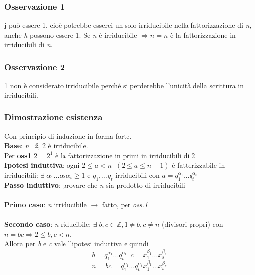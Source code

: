 \subsubsection{Osservazione 1}
j può essere 1, cioè potrebbe esserci un solo irriducibile nella fattorizzazione di \textit{n}, anche \textit{h} possono essere 1.
Se \textit{n} è irriducibile \(\Rightarrow n=n\) è la fattorizzazione in irriducibili di \textit{n}.

\subsubsection{Osservazione 2}
1 non è considerato irriducibile perché si perderebbe l'unicità della scrittura in irriducibili.

\subsubsection{Dimostrazione esistenza}
Con principio di induzione in forma forte.
\\
\textbf{Base}: \textit{n=2}, 2 è irriducibile.
\\
Per \textbf{oss1} \(2=2^1\) è la fattorizzazione in primi in irriducibili di 2
\\
\textbf{Ipotesi induttiva}: ogni \(2\leq a<n\;\;(2\leq a\leq n-1)\) è fattorizzabile in irriducibili: \(\exists\; \alpha _1...\alpha _t \alpha _i\geq 1\) e \(q_1,...q_t\) irriducibili con \(a=q^{\alpha _1}_1...q_t^{\alpha _t}\)
\\
\textbf{Passo induttivo}: provare che \textit{n} sia prodotto di irriducibili
\\\\
\textbf{Primo caso}: \textit{n} irriducibile \(\rightarrow\) fatto, per \textit{oss.1}
\\\\
\textbf{Secondo caso}: \textit{n} riducibile: \(\exists\;b,c\in\mathbb{Z}, 1\neq b, c\neq n\) (divisori propri) con \(n=bc\Rightarrow 2\leq b,c<n\).
\\
Allora per \textit{b} e \textit{c} vale l'ipotesi induttiva e quindi
\[b=q_1^{\alpha _1}...q_t^{\alpha _t}\;\; c= x_1^{\beta _1}...x_s^{\beta _s}\]
\[n=bc=q_1^{\alpha _1}...q_t^{\alpha _t} x_1^{\beta _1}...x_s^{\beta _s}\]

